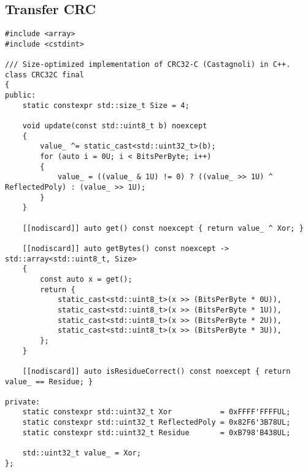 \subsection{Transfer CRC}

\begin{samepage}
\begin{verbatim}
#include <array>
#include <cstdint>

/// Size-optimized implementation of CRC32-C (Castagnoli) in C++.
class CRC32C final
{
public:
    static constexpr std::size_t Size = 4;

    void update(const std::uint8_t b) noexcept
    {
        value_ ^= static_cast<std::uint32_t>(b);
        for (auto i = 0U; i < BitsPerByte; i++)
        {
            value_ = ((value_ & 1U) != 0) ? ((value_ >> 1U) ^ ReflectedPoly) : (value_ >> 1U);
        }
    }

    [[nodiscard]] auto get() const noexcept { return value_ ^ Xor; }

    [[nodiscard]] auto getBytes() const noexcept -> std::array<std::uint8_t, Size>
    {
        const auto x = get();
        return {
            static_cast<std::uint8_t>(x >> (BitsPerByte * 0U)),
            static_cast<std::uint8_t>(x >> (BitsPerByte * 1U)),
            static_cast<std::uint8_t>(x >> (BitsPerByte * 2U)),
            static_cast<std::uint8_t>(x >> (BitsPerByte * 3U)),
        };
    }

    [[nodiscard]] auto isResidueCorrect() const noexcept { return value_ == Residue; }

private:
    static constexpr std::uint32_t Xor           = 0xFFFF'FFFFUL;
    static constexpr std::uint32_t ReflectedPoly = 0x82F6'3B78UL;
    static constexpr std::uint32_t Residue       = 0xB798'B438UL;

    std::uint32_t value_ = Xor;
};
\end{verbatim}
\end{samepage}
